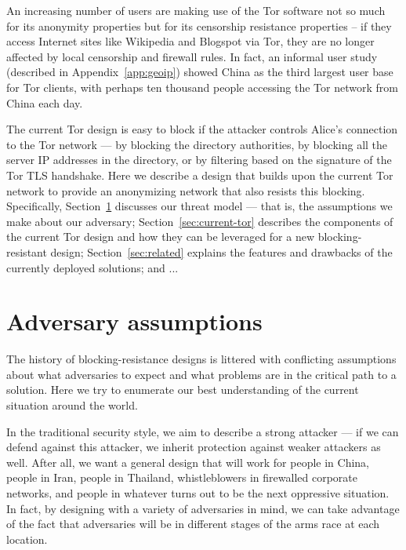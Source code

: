 \documentclass{llncs}
\begin{document}
An increasing number of users are making use of the Tor software
not so much for its anonymity properties but for its censorship
resistance properties -- if they access Internet sites like Wikipedia
and Blogspot via Tor, they are no longer affected by local censorship
and firewall rules. In fact, an informal user study (described in
Appendix~\ref{app:geoip}) showed China as the third largest user base
for Tor clients, with perhaps ten thousand people accessing the Tor
network from China each day.

The current Tor design is easy to block if the attacker controls Alice's
connection to the Tor network --- by blocking the directory authorities,
by blocking all the server IP addresses in the directory, or by filtering
based on the signature of the Tor TLS handshake. Here we describe a
design that builds upon the current Tor network to provide an anonymizing
network that also resists this blocking. Specifically,
Section~\ref{sec:adversary} discusses our threat model --- that is,
the assumptions we make about our adversary; Section~\ref{sec:current-tor}
describes the components of the current Tor design and how they can be
leveraged for a new blocking-resistant design; Section~\ref{sec:related}
explains the features and drawbacks of the currently deployed solutions;
and ...


\section{Adversary assumptions}
\label{sec:adversary}

The history of blocking-resistance designs is littered with conflicting
assumptions about what adversaries to expect and what problems are
in the critical path to a solution. Here we try to enumerate our best
understanding of the current situation around the world.

In the traditional security style, we aim to describe a strong attacker
--- if we can defend against this attacker, we inherit protection
against weaker attackers as well. After all, we want a general design
that will work for people in China, people in Iran, people in Thailand,
whistleblowers in firewalled corporate networks, and people in whatever
turns out to be the next oppressive situation. In fact, by designing with
a variety of adversaries in mind, we can take advantage of the fact that
adversaries will be in different stages of the arms race at each location.
\end{document}
